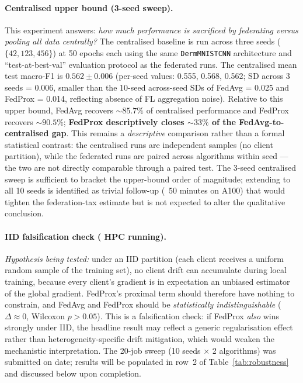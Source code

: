 \documentclass[11pt,a4paper]{article}
\newif\ifshowtodo
\newcommand{\TODOhpc}[1]{%
  \ifshowtodo\textcolor{red}{\textbf{[HPC PENDING: #1]}}\else#1\fi}
\begin{document}
\paragraph{Centralised upper bound (3-seed sweep).}
This experiment answers: \emph{how much performance is sacrificed by
federating versus pooling all data centrally?} The centralised baseline
is run across three seeds ($\{42, 123, 456\}$) at 50 epochs each using
the same \texttt{DermMNISTCNN} architecture and ``test-at-best-val''
evaluation protocol as the federated runs. The centralised mean test
macro-F1 is $\mathbf{0.562 \pm 0.006}$ (per-seed values: 0.555, 0.568,
0.562; SD across 3 seeds = 0.006, smaller than the 10-seed across-seed
SDs of FedAvg = 0.025 and FedProx = 0.014, reflecting absence of FL
aggregation noise). Relative to this upper bound, FedAvg recovers
$\sim 85.7\%$ of centralised performance and FedProx recovers
$\sim 90.5\%$; \textbf{FedProx descriptively closes $\sim 33\%$ of the
FedAvg-to-centralised gap}. This remains a \emph{descriptive} comparison
rather than a formal statistical contrast: the centralised runs are
independent samples (no client partition), while the federated runs are
paired across algorithms within seed --- the two are not directly
comparable through a paired test. The 3-seed centralised sweep is
sufficient to bracket the upper-bound order of magnitude; extending to
all 10 seeds is identified as trivial follow-up (~50 minutes on A100)
that would tighten the federation-tax estimate but is not expected to
alter the qualitative conclusion.

\paragraph{IID falsification check (\TODOhpc{HPC running}).}
\emph{Hypothesis being tested:} under an IID partition (each client receives
a uniform random sample of the training set), no client drift can accumulate
during local training, because every client's gradient is in expectation an
unbiased estimator of the global gradient. FedProx's proximal term should
therefore have nothing to constrain, and FedAvg and FedProx should be
\emph{statistically indistinguishable} ($\Delta \approx 0$, Wilcoxon
$p > 0.05$). This is a falsification check: if FedProx \emph{also} wins
strongly under IID, the headline result may reflect a generic regularisation
effect rather than heterogeneity-specific drift mitigation, which would
weaken the mechanistic interpretation. The 20-job sweep (10 seeds $\times$ 2
algorithms) was submitted on \TODOhpc{date}; results will be populated in
row~2 of Table~\ref{tab:robustness} and discussed below upon completion.
\end{document}
